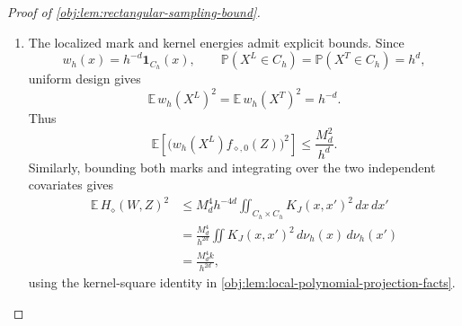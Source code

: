 \begin{proof}[Proof of \cref{obj:lem:rectangular-sampling-bound}]
\begin{enumerate}
Use the coordinate tags
\[
\diamond\in
\bigl(\{\mathrm R\}\times\mathcal U_d\bigr)
\sqcup
\bigl(\{\mathrm Q\}\times\mathcal U_d\times\mathcal U_d\bigr).
\]
For each tag, define the three mark functions by
\[
\begin{array}{c|ccc}
\diamond
& f_{\diamond,0}(Z)
& f_{\diamond,T}(W)
& f_{\diamond,L}(Z)\\ \hline
(\mathrm R,u)
& r_u(X^L)A^LY^L
& r_u(X^T)A^T
& Y^L\\
(\mathrm Q,u,v)
& r_u(X^L)r_v(X^L)A^L
& r_u(X^T)A^T
& r_v(X^L)A^L
\end{array}
\]
on the full record domains displayed above. Binary marks have absolute value at most one. The coarse-coordinate bound from the preceding step therefore gives
\[
\begin{aligned}
|f_{\diamond,0}(Z)|&\le M_d &&(X^L\in C_h),\\
|f_{\diamond,T}(W)|&\le M_d &&(X^T\in C_h),\\
|f_{\diamond,L}(Z)|&\le M_d &&(X^L\in C_h).
\end{aligned}
\]
Define
\[
H_\diamond(W,Z)
=w_h(X^T)w_h(X^L)K_J(X^T,X^L)
 f_{\diamond,T}(W)f_{\diamond,L}(Z),
\]
\[
\widehat S_\diamond
=\frac1\ell\sum_{j\in I_L}
 w_h(X_j)f_{\diamond,0}(Z_j),
\qquad
\widehat H_\diamond
=\frac1{t\ell}\sum_{i\in I_T}\sum_{j\in I_L}
 H_\diamond(W_i,Z_j),
\qquad
F_\diamond=\widehat S_\diamond-\widehat H_\diamond.
\]
These expressions vanish termwise whenever a localization weight is zero. The rectangular formulas in \cref{obj:def:moments} give exactly
\[
F_{(\mathrm R,u)}=(\widehat R_{h,J})_u,
\qquad
F_{(\mathrm Q,u,v)}
=(\widehat Q^{\mathrm{raw}}_{h,J})_{uv}.
\]
In the response identity, expanding the empirical projection gives the rectangular formula on \(C_h\); outside \(C_h\), its defining zero value and the zero localization weight give the same identity.

\item The localized mark and kernel energies admit explicit bounds. Since
\[
w_h(x)=h^{-d}\mathbf1_{C_h}(x),
\qquad
\mathbb P(X^L\in C_h)=\mathbb P(X^T\in C_h)=h^d,
\]
uniform design gives
\[
\mathbb E\,w_h(X^L)^2
=\mathbb E\,w_h(X^T)^2=h^{-d}.
\]
Thus
\[
\mathbb E\!\left[
 \bigl(w_h(X^L)f_{\diamond,0}(Z)\bigr)^2
 \right]\le \frac{M_d^2}{h^d}.
\]
Similarly, bounding both marks and integrating over the two independent covariates gives
\[
\begin{aligned}
\mathbb E\,H_\diamond(W,Z)^2
&\le M_d^4h^{-4d}
 \iint_{C_h\times C_h}K_J(x,x')^2\,dx\,dx'\\
&=\frac{M_d^4}{h^{2d}}
 \iint K_J(x,x')^2\,d\nu_h(x)\,d\nu_h(x')\\
&=\frac{M_d^4k}{h^{2d}},
\end{aligned}
\]
using the kernel-square identity in
\cref{obj:lem:local-polynomial-projection-facts}.


\end{enumerate}
\end{proof}
